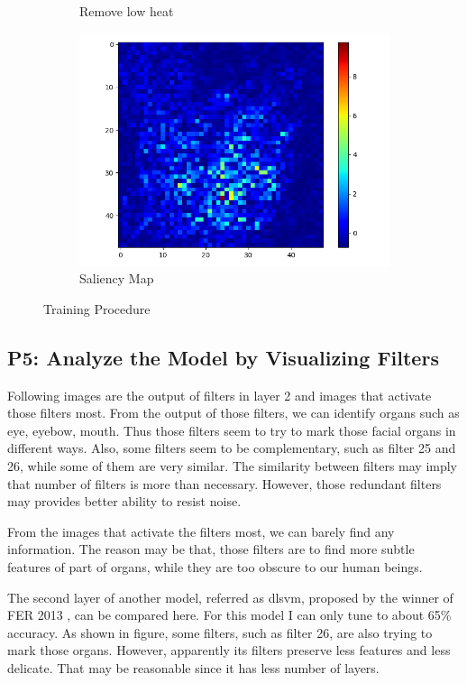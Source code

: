 \documentclass[fleqn,a4paper,12pt]{article}
\begin{document}
\begin{figure}[h]
\begin{subfigure}{.33\textwidth}
  \caption{Remove low heat}
  \label{fig:sub2}
\end{subfigure}
\begin{subfigure}{.33\textwidth}
  \centering  
  \includegraphics[width=\linewidth]{report-imgs/sa.png}
  \caption{Saliency Map}
  \label{fig:sub1}
\end{subfigure}%
\caption{Training Procedure}
\label{fig:test}
\end{figure}


\subsection*{P5: Analyze the Model by Visualizing Filters}

Following images are the output of filters in layer 2 and images that activate those filters most. From the output of those filters, we can identify organs such as eye, eyebow, mouth. Thus those filters seem to try to mark those facial organs in different ways. Also, some filters seem to be complementary, such as filter 25 and 26, while some of them are very similar. The similarity between filters may imply that number of filters is more than necessary. However, those redundant filters may provides better ability to resist noise.

From the images that activate the filters most, we can barely find any information. The reason may be that, those filters are to find more subtle features of part of organs, while they are too obscure to our human beings.

The second layer of another model, referred as dlsvm, proposed by the winner of FER 2013 \cite{dlsvm}, can be compared here. For this model I can only tune to about 65\% accuracy. As shown in figure, some filters, such as filter 26, are also trying to mark those organs. However, apparently its filters preserve less features and less delicate. That may be reasonable since it has less number of layers.
\end{document}
